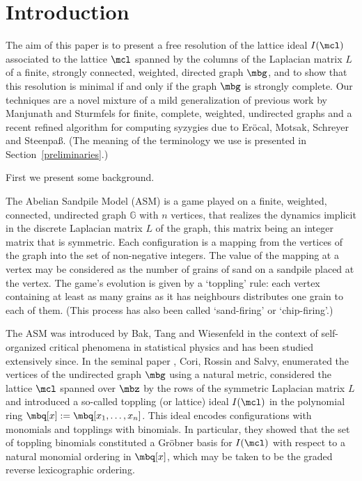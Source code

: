 \section{Introduction}

The aim of this paper is to present a free resolution of the lattice
ideal $I(\mcl)$ associated to the lattice $\mcl$ spanned by the
columns of the Laplacian matrix $L$ of a finite, strongly connected,
weighted, directed graph $\mbg$, and to show that this resolution is
minimal if and only if the graph $\mbg$ is strongly complete. Our
techniques are a novel mixture of a mild generalization of previous
work by Manjunath and Sturmfels for finite, complete, weighted,
undirected graphs and a recent refined algorithm for computing
syzygies due to Er\"ocal, Motsak, Schreyer and Steenpa{\ss}. (The
meaning of the terminology we use is presented in
Section~\ref{preliminaries}.)

First we present some background.

The Abelian Sandpile Model (ASM) is a game played on a finite,
weighted, connected, undirected graph $\mathbb{G}$ with $n$ vertices,
that realizes the dynamics implicit in the discrete Laplacian matrix
$L$ of the graph, this matrix being an integer matrix that is
symmetric. Each configuration is a mapping from the vertices of the
graph into the set of non-negative integers. The value of the mapping
at a vertex may be considered as the number of grains of sand on a
sandpile placed at the vertex. The game's evolution is given by a
`toppling' rule: each vertex containing at least as many grains as it
has neighbours distributes one grain to each of them.  (This process
has also been called `sand-firing' or `chip-firing'.)

The ASM was introduced by Bak, Tang and Wiesenfeld \cite{btw} in the
context of self-organized critical phenomena in statistical physics
and has been studied extensively since. In the seminal paper
\cite{crs}, Cori, Rossin and Salvy, enumerated the vertices of the
undirected graph $\mbg$ using a natural metric, considered the lattice
$\mcl$ spanned over $\mbz$ by the rows of the symmetric Laplacian
matrix $L$ and introduced a so-called toppling (or lattice) ideal
$I(\mcl)$ in the polynomial ring $\mbq[x]:=\mbq[x_1,\ldots
  ,x_n]$. This ideal encodes configurations with monomials and
topplings with binomials. In particular, they showed that the set of
toppling binomials constituted a Gr\"obner basis for $I(\mcl)$ with
respect to a natural monomial ordering in $\mbq[x]$, which may be
taken to be the graded reverse lexicographic ordering.

